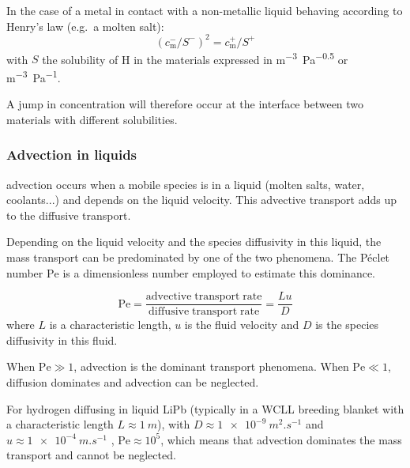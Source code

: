 In the case of a metal in contact with a non-metallic liquid behaving according to Henry's law (e.g.\ a molten salt):
\begin{equation}
    (c_\mathrm{m}^-/S^-)^2 = c_\mathrm{m}^+/S^+
\end{equation}
with $S$ the solubility of \gls{H} in the materials expressed in \si{m^{-3}.Pa^{-0.5}} or \si{m^{-3}.Pa^{-1}}.

A jump in concentration will therefore occur at the interface between two materials with different solubilities.

\subsubsection{Advection in liquids}
\Gls{advection} occurs when a mobile species is in a liquid (molten salts, water, coolants...) and depends on the liquid velocity.
This advective transport adds up to the diffusive transport.

Depending on the liquid velocity and the species diffusivity in this liquid, the mass transport can be predominated by one of the two phenomena.
The Péclet number $\mathrm{Pe}$ is a dimensionless number employed to estimate this dominance.

\begin{equation}
    \mathrm{Pe} = \frac{\mathrm{advective \; transport \; rate}}{\mathrm{diffusive \; transport \; rate}} = \frac{L u}{D}
\end{equation}
where $L$ is a characteristic length, $u$ is the fluid velocity and $D$ is the species diffusivity in this fluid.

When $\mathrm{Pe} \gg 1$, \gls{advection} is the dominant transport phenomena.
When $\mathrm{Pe} \ll 1$, \gls{diffusion} dominates and \gls{advection} can be neglected.

For hydrogen diffusing in liquid LiPb (typically in a WCLL breeding blanket with a characteristic length $L \approx \SI{1}{m}$), with $D \approx \SI{1e-9}{m^2.s^{-1}}$ and $u \approx \SI{1e-4}{m.s^{-1}}$ , $\mathrm{Pe} \approx 10^{5}$, which means that \gls{advection} dominates the mass transport and cannot be neglected.

